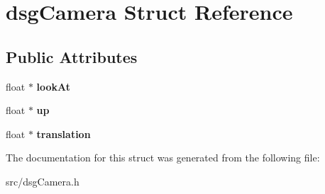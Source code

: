 \hypertarget{structdsgCamera}{}\section{dsg\+Camera Struct Reference}
\label{structdsgCamera}
\subsection*{Public Attributes}
\begin{DoxyCompactItemize}
\item 
\hypertarget{structdsgCamera_a6ece21c20bb32d1491b1750bda64788e}{}float $\ast$ {\bfseries look\+At}\label{structdsgCamera_a6ece21c20bb32d1491b1750bda64788e}

\item 
\hypertarget{structdsgCamera_a351546884a3de319c876e92e4dc0a2ba}{}float $\ast$ {\bfseries up}\label{structdsgCamera_a351546884a3de319c876e92e4dc0a2ba}

\item 
\hypertarget{structdsgCamera_a6174a458bb309ec19c6948d3af1232b4}{}float $\ast$ {\bfseries translation}\label{structdsgCamera_a6174a458bb309ec19c6948d3af1232b4}

\end{DoxyCompactItemize}


The documentation for this struct was generated from the following file\+:\begin{DoxyCompactItemize}
\item 
src/dsg\+Camera.\+h\end{DoxyCompactItemize}
